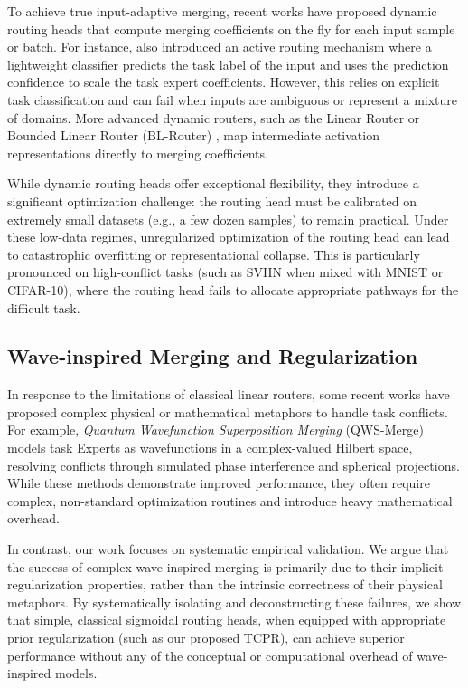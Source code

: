 To achieve true input-adaptive merging, recent works have proposed dynamic routing heads that compute merging coefficients on the fly for each input sample or batch. For instance, \citet{adamerging} also introduced an active routing mechanism where a lightweight classifier predicts the task label of the input and uses the prediction confidence to scale the task expert coefficients. However, this relies on explicit task classification and can fail when inputs are ambiguous or represent a mixture of domains. More advanced dynamic routers, such as the Linear Router or Bounded Linear Router (BL-Router) \cite{adamerging}, map intermediate activation representations directly to merging coefficients. 

While dynamic routing heads offer exceptional flexibility, they introduce a significant optimization challenge: the routing head must be calibrated on extremely small datasets (e.g., a few dozen samples) to remain practical. Under these low-data regimes, unregularized optimization of the routing head can lead to catastrophic overfitting or representational collapse. This is particularly pronounced on high-conflict tasks (such as SVHN when mixed with MNIST or CIFAR-10), where the routing head fails to allocate appropriate pathways for the difficult task.

\subsection{Wave-inspired Merging and Regularization}
In response to the limitations of classical linear routers, some recent works have proposed complex physical or mathematical metaphors to handle task conflicts. For example, \emph{Quantum Wavefunction Superposition Merging} (QWS-Merge) models task Experts as wavefunctions in a complex-valued Hilbert space, resolving conflicts through simulated phase interference and spherical projections. While these methods demonstrate improved performance, they often require complex, non-standard optimization routines and introduce heavy mathematical overhead.

In contrast, our work focuses on systematic empirical validation. We argue that the success of complex wave-inspired merging is primarily due to their implicit regularization properties, rather than the intrinsic correctness of their physical metaphors. By systematically isolating and deconstructing these failures, we show that simple, classical sigmoidal routing heads, when equipped with appropriate prior regularization (such as our proposed TCPR), can achieve superior performance without any of the conceptual or computational overhead of wave-inspired models.
